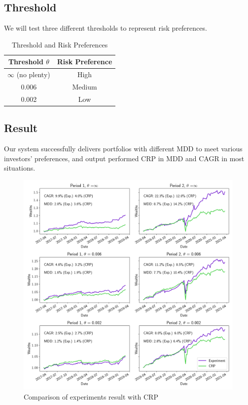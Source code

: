 \subsection{Threshold}
We will test three different thresholds to represent risk preferences.  
\begin{table}[htb]
    \centering
    \begin{tabular}{|c|c|}
    \hline \hline
    Threshold $\theta$ & Risk Preference \\ \hline
    $\infty$  (no plenty) & High \\ \hline
    0.006 & Medium      \\ \hline
    0.002 & Low      \\ \hline    
    \hline
    \end{tabular}
    \caption{Threshold and Risk Preferences}
    \label{tab:threshold}
\end{table}
\subsection{Result}
Our system successfully delivers portfolios with different MDD to meet various investors' preferences, and output performed CRP in MDD and CAGR in most situations.

\begin{figure}[htb]
\centering
  \includegraphics[width=16cm]{images/crp_compare.png}
  \caption [Comparison of experiments result with CRP]{Comparison of experiments result with CRP}
  \label{fig:crp_compare}
\end{figure}
